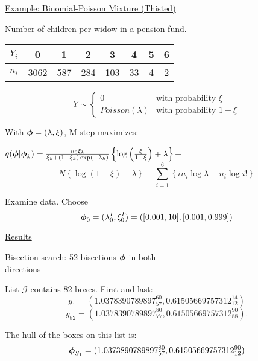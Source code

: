 \documentclass{slides}
\begin{document}
\begin{slide}
\begin{center}
\underline{Example: Binomial-Poisson Mixture (Thisted)}
\end{center}
Number of children per widow in a pension fund.
\begin{center}
\begin{tabular}{l|c|c|c|c|c|c|c}
$Y_i$ & 0 & 1 & 2 & 3 & 4 & 5 & 6 \\ \hline
$n_i$ & 3062 & 587 & 284 & 103 & 33 & 4 & 2
\end{tabular}
\end{center}

\begin{equation}
Y \sim \left\{ \begin{array}{ll}
0 & \mbox{with probability } \xi \\ \nonumber
Poisson(\lambda) & \mbox{with probability } 1-\xi  \nonumber
\end{array}\right.
\end{equation}

With $\mbox{\boldmath $\phi$}=(\lambda,\xi)$, M-step maximizes:

$
q(\mbox{\boldmath $\phi$}|\mbox{\boldmath $\phi$}_k) = \frac{n_0 \xi_k}{\xi_k + (1-\xi_k)\exp(-\lambda_k)}
\left\{ \log\left(\frac{\xi}{1-\xi}\right) +\lambda \right\} + 
$
$$
N \left\{ \log (1-\xi) - \lambda \right\}
+ \sum_{i=1}^6 \left\{ i n_i \log \lambda - n_i \log i! \right\}
$$

Examine data.  Choose
$$\mbox{\boldmath $\phi$}_0 = (\lambda_0^I, \xi_0^I) = ([0.001,10],[0.001,0.999])$$ 
\end{slide}
\begin{slide}
\begin{center}
\underline{Results}
\end{center}

Bisection search: 52 bisections $\mbox{\boldmath $\phi$}$ in both \\
directions

List $\mathcal{G}$ contains 82 boxes.  First and last:
$$y_1 = (1.0378390789897_{57}^{60}, 0.61505669757312_{12}^{14})$$
$$y_{82} = (1.0378390789897_{77}^{80}, 0.61505669757312_{88}^{90}).$$

The hull of the boxes on this list is:
$$
\mbox{\boldmath $\phi$}_{S_1} = (1.0373890789897_{57}^{80},  0.61505669757312_{12}^{90})
$$
\end{slide}
\end{document}
